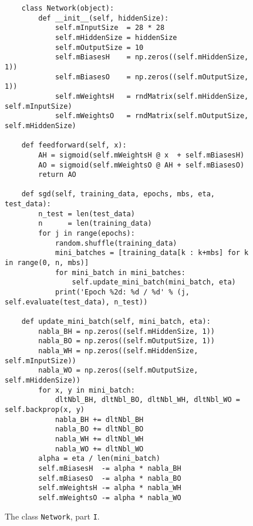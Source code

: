 \begin{figure}[!ht]
\centering
\begin{verbatim}
    class Network(object):
        def __init__(self, hiddenSize):
            self.mInputSize  = 28 * 28
            self.mHiddenSize = hiddenSize
            self.mOutputSize = 10
            self.mBiasesH    = np.zeros((self.mHiddenSize, 1))   
            self.mBiasesO    = np.zeros((self.mOutputSize, 1))   
            self.mWeightsH   = rndMatrix(self.mHiddenSize, self.mInputSize)  
            self.mWeightsO   = rndMatrix(self.mOutputSize, self.mHiddenSize) 
    
    def feedforward(self, x):
        AH = sigmoid(self.mWeightsH @ x  + self.mBiasesH) 
        AO = sigmoid(self.mWeightsO @ AH + self.mBiasesO) 
        return AO        
    
    def sgd(self, training_data, epochs, mbs, eta, test_data):
        n_test = len(test_data)
        n      = len(training_data)
        for j in range(epochs):
            random.shuffle(training_data)
            mini_batches = [training_data[k : k+mbs] for k in range(0, n, mbs)]
            for mini_batch in mini_batches:
                self.update_mini_batch(mini_batch, eta)    
            print('Epoch %2d: %d / %d' % (j, self.evaluate(test_data), n_test))
            
    def update_mini_batch(self, mini_batch, eta):
        nabla_BH = np.zeros((self.mHiddenSize, 1))  
        nabla_BO = np.zeros((self.mOutputSize, 1))  
        nabla_WH = np.zeros((self.mHiddenSize, self.mInputSize))
        nabla_WO = np.zeros((self.mOutputSize, self.mHiddenSize))
        for x, y in mini_batch:
            dltNbl_BH, dltNbl_BO, dltNbl_WH, dltNbl_WO = self.backprop(x, y)
            nabla_BH += dltNbl_BH
            nabla_BO += dltNbl_BO
            nabla_WH += dltNbl_WH
            nabla_WO += dltNbl_WO      
        alpha = eta / len(mini_batch)
        self.mBiasesH  -= alpha * nabla_BH
        self.mBiasesO  -= alpha * nabla_BO
        self.mWeightsH -= alpha * nabla_WH
        self.mWeightsO -= alpha * nabla_WO
\end{verbatim}
\vspace*{-0.3cm}
\caption{The class \texttt{Network}, part \texttt{I}.}
\label{fig:Digit-Regocnition.ipynb-3}
\end{figure}


